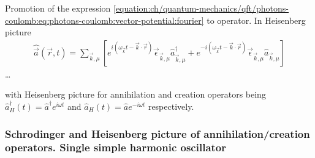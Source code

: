 \documentclass[letterpaper,10pt,english]{jupyterBook}
\begin{document}
\sphinxAtStartPar
Promotion of the expression \eqref{equation:ch/quantum-mechanics/qft/photons-coulomb:eq:photons-coulomb:vector-potential:fourier} to operator. In Heisenberg picture
\begin{equation*}
\begin{split}
\hat{\vec{a}}(\vec{r},t) = \sum_{\vec{k}, \mu} \left[ e^{i ( \omega_{\vec{k}} t - \vec{k} \cdot \vec{r} )} \vec{\epsilon}_{\vec{k}, \mu} \hat{a}^\dagger_{\vec{k},\mu} + e^{- i ( \omega_{\vec{k}} t - \vec{k} \cdot \vec{r})} \vec{\epsilon}_{\vec{k},\mu} \hat{a}_{\vec{k},\mu} \right]
\end{split}
\end{equation*}
\sphinxAtStartPar
…

\sphinxAtStartPar
with Heisenberg picture for annihilation and creation operators being \(\hat{a}^\dagger_H(t) = \hat{a}^\dagger e^{i \omega t}\) and \(\hat{a}_H(t) = \hat{a} e^{-i \omega t}\) respectively.

\sphinxAtStartPar
{} 
\subsubsection*{Schrodinger and Heisenberg picture of annihilation/creation operators. Single simple harmonic oscillator}
\end{document}
